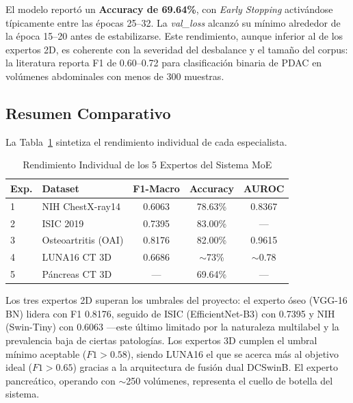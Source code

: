 \documentclass[conference, 11pt]{IEEEtran}
\begin{document}
El modelo reportó un \textbf{Accuracy de 69.64\%}, con \textit{Early Stopping} activándose típicamente entre las épocas 25--32. La \textit{val\_loss} alcanzó su mínimo alrededor de la época 15--20 antes de estabilizarse. Este rendimiento, aunque inferior al de los expertos 2D, es coherente con la severidad del desbalance y el tamaño del corpus: la literatura reporta F1 de 0.60--0.72 para clasificación binaria de PDAC en volúmenes abdominales con menos de 300 muestras.

\subsection{Resumen Comparativo}
La Tabla~\ref{tab:f1_expertos} sintetiza el rendimiento individual de cada especialista.

\begin{table}[htbp]
\caption{Rendimiento Individual de los 5 Expertos del Sistema MoE}
\begin{center}
\begin{tabular}{|l|l|c|c|c|}
\hline
\textbf{Exp.} & \textbf{Dataset} & \textbf{F1-Macro} & \textbf{Accuracy} & \textbf{AUROC} \\
\hline
1 & NIH ChestX-ray14 & 0.6063 & 78.63\% & 0.8367 \\
2 & ISIC 2019 & 0.7395 & 83.00\% & --- \\
3 & Osteoartritis (OAI) & 0.8176 & 82.00\% & 0.9615 \\
4 & LUNA16 CT 3D & 0.6686 & $\sim$73\% & $\sim$0.78 \\
5 & Páncreas CT 3D & --- & 69.64\% & --- \\
\hline
\end{tabular}
\label{tab:f1_expertos}
\end{center}
\end{table}

Los tres expertos 2D superan los umbrales del proyecto: el experto óseo (VGG-16 BN) lidera con F1 0.8176, seguido de ISIC (EfficientNet-B3) con 0.7395 y NIH (Swin-Tiny) con 0.6063 ---este último limitado por la naturaleza multilabel y la prevalencia baja de ciertas patologías. Los expertos 3D cumplen el umbral mínimo aceptable ($F1 > 0.58$), siendo LUNA16 el que se acerca más al objetivo ideal ($F1 > 0.65$) gracias a la arquitectura de fusión dual DCSwinB. El experto pancreático, operando con $\sim$250 volúmenes, representa el cuello de botella del sistema.
\end{document}
